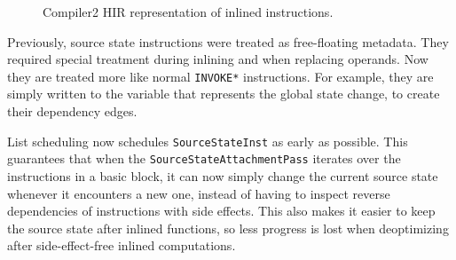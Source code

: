 \documentclass[draft,final]{vutinfth} %
\begin{document}
    \begin{figure}
        \centering
        \caption{Compiler2 HIR representation of inlined instructions.}
        \label{fig:source-states}
    \end{figure}

    Previously, source state instructions were treated as free-floating metadata.
    They required special treatment during inlining and when replacing operands.
    Now they are treated more like normal \lstinline{INVOKE*} instructions.
    For example,
    they are simply written to the variable that represents the global state change,
    to create their dependency edges.

    List scheduling now schedules \lstinline{SourceStateInst} as early as possible.
    This guarantees that when the \lstinline{SourceStateAttachmentPass} iterates over the instructions in a basic block,
    it can now simply change the current source state whenever it encounters a new one,
    instead of having to inspect reverse dependencies of instructions with side effects.
    This also makes it easier to keep the source state after inlined functions,
    so less progress is lost when deoptimizing after side-effect-free inlined computations.
\end{document}
